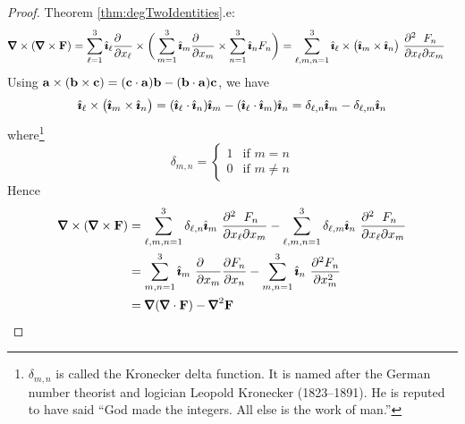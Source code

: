 \begin{proof}
\bigskip
\noindent Theorem \ref{thm:degTwoIdentities}.e:
\begin{align*}
\vnabla\times(\vnabla\times\vF)
&=\sum_{\ell=1}^3\hi_\ell\frac{\partial\hfill} {\partial x_\ell}
       \times\bigg(\sum_{m=1}^3 \hi_m\frac{\partial\hfill} {\partial x_m}
       \times\sum_{n=1}^3\hi_n F_n\bigg)
=\sum_{\ell,m,n=1}^3\hi_\ell\times \big(\hi_m\times\hi_n\big)\ 
          \frac{\partial^2\hfill F_n\hfill}
                           {\partial x_\ell\partial x_m}
\end{align*}
Using $\mathbf{a}\times(\mathbf{b}\times\mathbf{c})=(\mathbf{c}\cdot\mathbf{a})\mathbf{b}-(\mathbf{b}\cdot\mathbf{a})\mathbf{c}$,
we have 
\begin{equation*}
\hat{\pmb{\imath}}_\ell\times \big(\hat{\pmb{\imath}}_m\times\hat{\pmb{\imath}}_n\big)
          =(\hat{\pmb{\imath}}_\ell\cdot\hat{\pmb{\imath}}_n)\hat{\pmb{\imath}}_m -(\hat{\pmb{\imath}}_\ell\cdot\hat{\pmb{\imath}}_m)\hat{\pmb{\imath}}_n
          =\delta_{\ell,n}\hat{\pmb{\imath}}_m -\delta_{\ell,m}\hat{\pmb{\imath}}_n
\end{equation*}
where\footnote{$\delta_{m,n}$ is called the Kronecker delta function.
It is named after the German number theorist and logician Leopold Kronecker
(1823--1891). He is reputed to have said ``God made the integers. All else is the work of man.''} 
\begin{equation*}
\delta_{m,n} =\begin{cases}
                  1& \text{if $m=n$}\\
                  0& \text{if $m\ne n$}
              \end{cases}
\end{equation*}
Hence
\begin{align*}
\vnabla\times(\vnabla\times\vF)
&=\sum_{\ell,m,n=1}^3\delta_{\ell,n}\hi_m\ 
          \frac{\partial^2\hfill F_n\hfill}
                           {\partial x_\ell\partial x_m}
-\sum_{\ell,m,n=1}^3\delta_{\ell,m}\hi_n\ 
          \frac{\partial^2\hfill F_n\hfill}
                           {\partial x_\ell\partial x_m} \\
&=\sum_{m,n=1}^3\hi_m\ \frac{\partial\hfill}{\partial x_m}
          \frac{\partial\hfill F_n\hfill}{\partial x_n}
-\sum_{m,n=1}^3\hi_n\  \frac{\partial^2 F_n}{\partial x_m^2}\cr
&= \vnabla(\vnabla\cdot\vF)-\vnabla^2\vF
\end{align*}
\end{proof}

